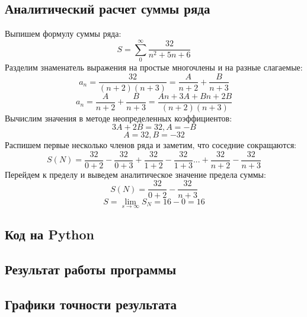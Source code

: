 \documentclass[a4paper,12pt]{article}
\newenvironment{longlisting}{\captionsetup{type=listing}}{}
\begin{document}
\subsection{Аналитический расчет суммы ряда}
Выпишем формулу суммы ряда:
   $$S = \sum_{0}^{\infty} \frac{32}{n^2 +5n + 6}$$
Разделим знаменатель выражения на простые многочлены и на разные слагаемые:
   $$a_n =  \frac{32}{(n+2)(n+3)} = \frac{A}{n+2} + \frac{B}{n+3}$$
   $$$$
   $$a_n = \frac{A}{n+2} + \frac{B}{n+3} = \frac{An + 3A + Bn + 2B}{(n+2)(n+3)}$$
Вычислим значения в методе неопределенных коэффициентов:
   $$3A + 2B = 32, A=-B$$
   $$A=32, B=-32$$
Распишем первые несколько членов ряда и заметим, что соседние сокращаются:
   $$S(N) = \frac{32}{0+2} - \frac{32}{0+3} + \frac{32}{1+2} - \frac{32}{1+3}  ... + \frac{32}{n+2} - \frac{32}{n+3}$$
Перейдем к пределу и выведем аналитическое значение предела суммы:
   $$S(N) = \frac{32}{0+2} - \frac{32}{n+3}$$
   $$S = \lim_{s\rightarrow \infty}S_N = 16 - 0 = 16$$

\subsection{Код на Python}

\begin{longlisting}
\end{longlisting}

\subsection{Результат работы программы}
\begin{longlisting}

\end{longlisting}

\subsection{Графики точности результата}
\end{document}
